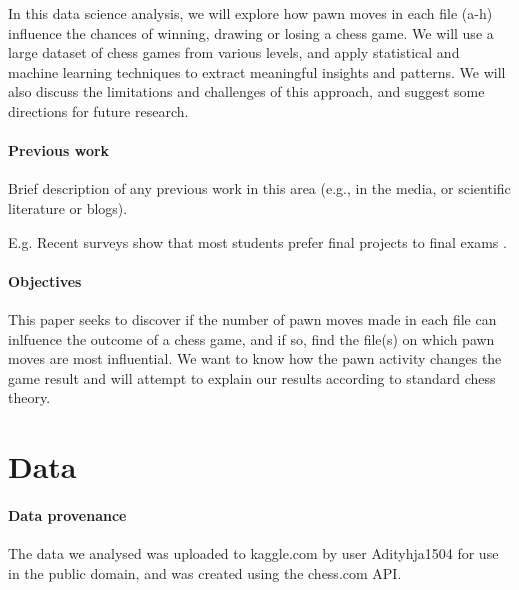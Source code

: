 \documentclass[11pt,a4paper]{article}
\begin{document}
In this data science analysis, we will explore how pawn moves in each file (a-h) 
influence the chances of winning, drawing or losing a chess game. We will use 
a large dataset of chess games from various levels, and apply 
statistical and machine learning techniques to extract meaningful insights and 
patterns. We will also discuss the limitations and challenges of this 
approach, and suggest some directions for future research.


\paragraph{Previous work}

Brief description of any previous work in this area (e.g., in the
media, or scientific literature or blogs).

E.g. Recent surveys show that most students prefer final projects to
final exams \cite{Space2021}.

\paragraph{Objectives}
This paper seeks to discover if the number of pawn moves made in each file 
can inlfuence the outcome of a chess game, and if so, find the file(s) on 
which pawn moves are most influential. 
We want to know how the pawn activity changes the game result and will attempt 
to explain our results according to standard chess theory.

\section{Data}

\paragraph{Data provenance} The data we analysed was uploaded to kaggle.com by user Adityhja1504 for use in the public domain, and was created using the chess.com API.
\end{document}
